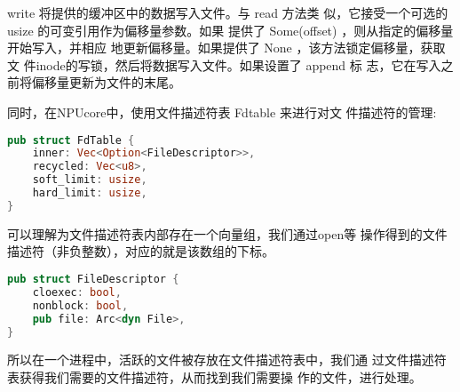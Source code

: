 write 将提供的缓冲区中的数据写入文件。与 read 方法类
似，它接受一个可选的 usize 的可变引用作为偏移量参数。如果
提供了 Some(offset) ，则从指定的偏移量开始写入，并相应
地更新偏移量。如果提供了 None ，该方法锁定偏移量，获取文
件inode的写锁，然后将数据写入文件。如果设置了 append 标
志，它在写入之前将偏移量更新为文件的末尾。

同时，在NPUcore中，使用文件描述符表 Fdtable 来进行对文
件描述符的管理:

\begin{lstlisting}[language=Rust]
pub struct FdTable {
	inner: Vec<Option<FileDescriptor>>,
	recycled: Vec<u8>,
	soft_limit: usize,
	hard_limit: usize,
}
\end{lstlisting}

可以理解为文件描述符表内部存在一个向量组，我们通过open等
操作得到的文件描述符（非负整数），对应的就是该数组的下标。

\begin{lstlisting}[language=Rust]
pub struct FileDescriptor {
	cloexec: bool,
	nonblock: bool,
	pub file: Arc<dyn File>,
}
\end{lstlisting}

所以在一个进程中，活跃的文件被存放在文件描述符表中，我们通
过文件描述符表获得我们需要的文件描述符，从而找到我们需要操
作的文件，进行处理。